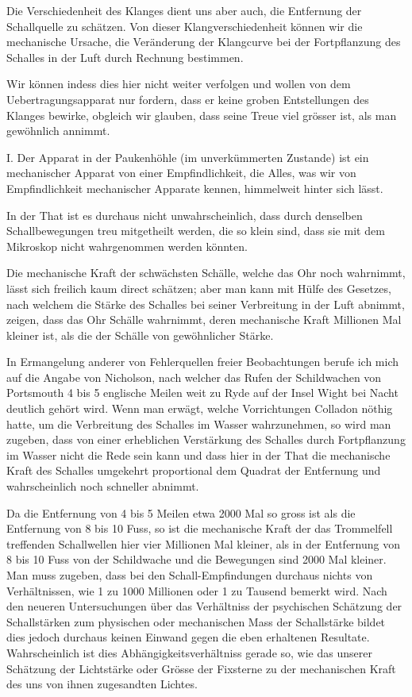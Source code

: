 \documentclass[12pt,a4paper]{article}
\begin{document}
Die Verschiedenheit des Klanges dient uns aber auch, die Entfernung der Schallquelle zu sch\"atzen. Von dieser Klangverschiedenheit k\"onnen wir die mechanische Ursache, die Ver\"anderung der Klangcurve bei der Fortpflanzung des Schalles in der Luft durch Rechnung bestimmen.

Wir k\"onnen indess dies hier nicht weiter verfolgen und wollen von dem Uebertragungsapparat nur fordern, dass er keine groben Entstellungen des Klanges bewirke, obgleich wir glauben, dass seine Treue viel gr\"osser ist, als man gew\"ohnlich annimmt.

I. Der Apparat in der Paukenh\"ohle (im unverk\"ummerten Zustande) ist ein mechanischer Apparat von einer Empfindlichkeit, die Alles, was wir von Empfindlichkeit mechanischer Apparate kennen, himmelweit hinter sich l\"asst.

In der That ist es durchaus nicht unwahrscheinlich, dass durch denselben Schallbewegungen treu mitgetheilt werden, die so klein sind, dass sie mit dem Mikroskop nicht wahrgenommen werden k\"onnten.

Die mechanische Kraft der schw\"achsten Sch\"alle, welche das Ohr noch wahrnimmt, l\"asst sich freilich kaum direct sch\"atzen; aber man kann mit H\"ulfe des Gesetzes, nach welchem die St\"arke des Schalles bei seiner Verbreitung in der Luft abnimmt, zeigen, dass das Ohr Sch\"alle wahrnimmt, deren mechanische Kraft Millionen Mal kleiner ist, als die der Sch\"alle von gew\"ohnlicher St\"arke.

In Ermangelung anderer von Fehlerquellen freier Beobachtungen berufe ich mich auf die Angabe von Nicholson, nach welcher das Rufen der Schildwachen von Portsmouth 4 bis 5 englische Meilen weit zu Ryde auf der Insel Wight bei Nacht deutlich geh\"ort wird. Wenn man erw\"agt, welche Vorrichtungen Colladon n\"othig hatte, um die Verbreitung des Schalles im Wasser wahrzunehmen, so wird man zugeben, dass von einer erheblichen Verst\"arkung des Schalles durch Fortpflanzung im Wasser nicht die Rede sein kann und dass hier in der That die mechanische Kraft des Schalles umgekehrt proportional dem Quadrat der Entfernung und wahrscheinlich noch schneller abnimmt.

Da die Entfernung von 4 bis 5 Meilen etwa 2000 Mal so gross ist als die Entfernung von 8 bis 10 Fuss, so ist die mechanische Kraft der das Trommelfell treffenden Schallwellen hier vier Millionen Mal kleiner, als in der Entfernung von 8 bis 10 Fuss von der Schildwache und die Bewegungen sind 2000 Mal kleiner. Man muss zugeben, dass bei den Schall-Empfindungen durchaus nichts von Verh\"altnissen, wie 1 zu 1000 Millionen oder 1 zu Tausend bemerkt wird. Nach den neueren Untersuchungen \"uber das Verh\"altniss der psychischen Sch\"atzung der Schallst\"arken zum physischen oder mechanischen Mass der Schallst\"arke bildet dies jedoch durchaus keinen Einwand gegen die eben erhaltenen Resultate. Wahrscheinlich ist dies Abh\"angigkeitsverh\"altniss gerade so, wie das unserer Sch\"atzung der Lichtst\"arke oder Gr\"osse der Fixsterne zu der mechanischen Kraft des uns von ihnen zugesandten Lichtes.
\end{document}
